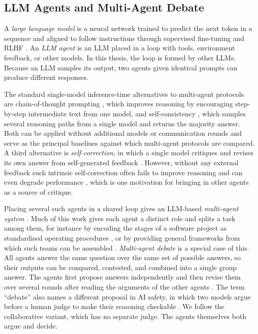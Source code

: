 \subsection{\texorpdfstring{\acs{LLM}}{LLM} Agents and Multi-Agent Debate}
\label{sec:bg:mad}

A \emph{large language model} is a neural network trained to predict
the next token in a sequence and aligned to follow instructions through
supervised fine-tuning and \ac{RLHF}
\citep{ouyang2022instructgpt}. An \emph{\ac{LLM} agent} is an \ac{LLM} placed in a loop
with tools, environment feedback, or other models. In this thesis, the loop is
formed by other \acp{LLM}. Because an \ac{LLM} samples its output, two agents given
identical prompts can produce different responses.

The standard single-model inference-time alternatives to multi-agent protocols
are chain-of-thought prompting \citep{wei2022chainofthought}, which improves
reasoning by encouraging step-by-step intermediate text from one model, and
self-consistency \citep{wang2023selfconsistency}, which samples several
reasoning paths from a single model and returns the majority answer. Both can
be applied without additional models or communication rounds and serve as the
principal baselines against which multi-agent protocols are compared. A third
alternative is \emph{self-correction}, in which a single model critiques and
revises its own answer from self-generated feedback
\citep{madaan2023selfrefine}. However, without any external feedback such
intrinsic self-correction often fails to improve reasoning and can even degrade
performance \citep{huang2024selfcorrect}, which is one motivation for bringing in other
agents as a source of critique.

Placing several such agents in a shared loop gives an \ac{LLM}-based
\emph{multi-agent system} \citep{guo2024survey}. Much of this work gives each
agent a distinct role and splits a task among them, for instance by encoding the
stages of a software project as standardised operating procedures
\citep{hong2024metagpt}, or by providing general frameworks from which such
teams can be assembled \citep{chen2024agentverse}. \emph{Multi-agent debate} is a special case of this. All agents answer the same question over the same set
of possible answers, so their outputs can be compared, contested, and combined
into a single group answer. The agents first propose answers independently and then
revise them over several rounds after reading the arguments of the other agents
\citep{du2024improving}. The term ``debate'' also names a different proposal in
\ac{AI} safety, in which two models argue before a human judge to make their
reasoning checkable \citep{irving2018safety}. We follow the collaborative
variant, which has no separate judge. The agents themselves both argue and
decide.

